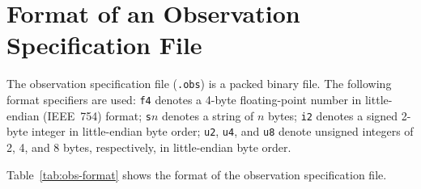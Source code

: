 
\section{Format of an Observation Specification File}

The observation specification file (\texttt{.obs}) is a packed binary file.  The following format specifiers are used:  \texttt{f4} denotes a 4-byte floating-point number in little-endian (IEEE~754) format;  \texttt{s$n$} denotes a string of $n$ bytes;  \texttt{i2} denotes a signed 2-byte integer in little-endian byte order;  \texttt{u2}, \texttt{u4}, and \texttt{u8} denote unsigned integers of 2, 4, and 8 bytes, respectively, in little-endian byte order.

Table~\ref{tab:obs-format} shows the format of the observation specification file.

